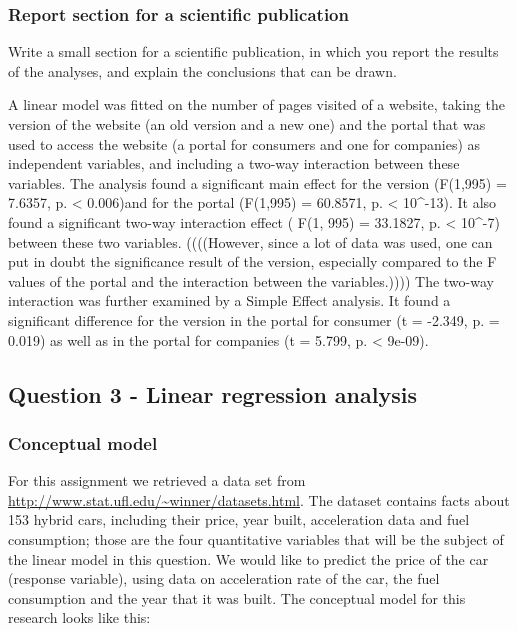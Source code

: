 \documentclass[]{article}
\begin{document}
\subsubsection{Report section for a scientific
publication}\label{report-section-for-a-scientific-publication-1}

Write a small section for a scientific publication, in which you report
the results of the analyses, and explain the conclusions that can be
drawn.

A linear model was fitted on the number of pages visited of a website,
taking the version of the website (an old version and a new one) and the
portal that was used to access the website (a portal for consumers and
one for companies) as independent variables, and including a two-way
interaction between these variables. The analysis found a significant
main effect for the version (F(1,995) = 7.6357, p. \textless{} 0.006)and
for the portal (F(1,995) = 60.8571, p. \textless{} 10\^{}-13). It also
found a significant two-way interaction effect ( F(1, 995) = 33.1827, p.
\textless{} 10\^{}-7) between these two variables. ((((However, since a
lot of data was used, one can put in doubt the significance result of
the version, especially compared to the F values of the portal and the
interaction between the variables.)))) The two-way interaction was
further examined by a Simple Effect analysis. It found a significant
difference for the version in the portal for consumer (t = -2.349, p. =
0.019) as well as in the portal for companies (t = 5.799, p. \textless{}
9e-09).

\subsection{Question 3 - Linear regression
analysis}\label{question-3---linear-regression-analysis}

\subsubsection{Conceptual model}\label{conceptual-model-2}

For this assignment we retrieved a data set from
\url{http://www.stat.ufl.edu/~winner/datasets.html}. The dataset
contains facts about 153 hybrid cars, including their price, year built,
acceleration data and fuel consumption; those are the four quantitative
variables that will be the subject of the linear model in this question.
We would like to predict the price of the car (response variable), using
data on acceleration rate of the car, the fuel consumption and the year
that it was built. The conceptual model for this research looks like
this:
\end{document}
